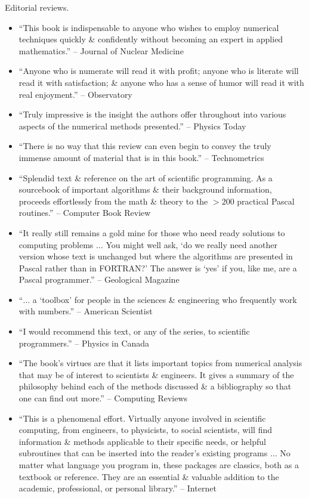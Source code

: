 \documentclass{article}
\begin{document}
\begin{enumerate}
	{\sf Editorial reviews.}
	\begin{itemize}
		\item ``This book is indispensable to anyone who wishes to employ numerical techniques quickly \& confidently without becoming an expert in applied mathematics.'' --
		Journal of Nuclear Medicine
		\item ``Anyone who is numerate will read it with profit; anyone who is literate will read it with satisfaction; \& anyone who has a sense of humor will read it with real enjoyment.'' -- Observatory
		\item ``Truly impressive is the insight the authors offer throughout into various aspects of the numerical methods presented.'' -- Physics Today
		\item ``There is no way that this review can even begin to convey the truly immense amount of material that is in this book.'' -- Technometrics
		\item ``Splendid text \& reference on the art of scientific programming. As a sourcebook of important algorithms \& their background information, proceeds effortlessly from the math \& theory to the $> 200$ practical Pascal routines.'' -- Computer Book Review
		\item ``It really still remains a gold mine for those who need ready solutions to computing problems $\ldots$ You might well ask, `do we really need another version whose text is unchanged but where the algorithms are presented in Pascal rather than in FORTRAN?' The answer is `yes' if you, like me, are a Pascal programmer.'' -- Geological Magazine
		\item ``$\ldots$ a `toolbox' for people in the sciences \& engineering who frequently work with numbers.'' -- American Scientist
		\item ``I would recommend this text, or any of the series, to scientific programmers.'' -- Physics in Canada
		\item ``The book's virtues are that it lists important topics from numerical analysis that may be of interest to scientists \& engineers. It gives a summary of the philosophy behind each of the methods discussed \& a bibliography so that one can find out more.'' -- Computing Reviews
		\item ``This is a phenomenal effort. Virtually anyone involved in scientific computing, from engineers, to physicists, to social scientists, will find information \& methods applicable to their specific needs, or helpful subroutines that can be inserted into the reader's existing programs $\ldots$ No matter what language you program in, these packages are classics, both as a textbook or reference. They are an essential \& valuable addition to the academic, professional, or personal library.'' -- Internet
	\end{itemize}


\end{enumerate}
\end{document}
